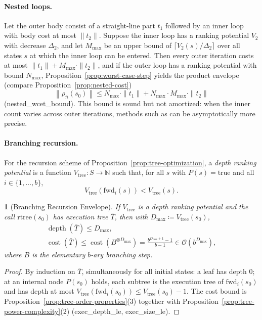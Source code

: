 \documentclass[oneside,english]{amsart}
\numberwithin{equation}{section}
\numberwithin{figure}{section}
\theoremstyle{plain}
\theoremstyle{definition}
\theoremstyle{plain}
\newtheorem{prop}[thm]{\protect\propositionname}
\theoremstyle{remark}
\theoremstyle{plain}
\theoremstyle{definition}
\theoremstyle{plain}
\theoremstyle{remark}
\DeclareMathOperator{\cost}{cost}
\DeclareMathOperator{\depth}{depth}
\newcommand{\lean}[1]{{\ttfamily\small #1}}
\providecommand{\propositionname}{Proposition}
\begin{document}
\paragraph{Nested loops.}
Let the outer body consist of a straight-line part $t_1$ followed by an inner loop with body cost at most $\|t_2\|$. Suppose the inner loop has a ranking potential $V_2$ with decrease $\Delta_2$, and let $M_{\max}$ be an upper bound of $\lceil V_2(s)/\Delta_2 \rceil$ over all states $s$ at which the inner loop can be entered. Then every outer iteration costs at most $\|t_1\| + M_{\max} \cdot \|t_2\|$, and if the outer loop has a ranking potential with bound $N_{\max}$, Proposition~\ref{prop:worst-case-step} yields the product envelope (compare Proposition~\ref{prop:nested-cost})
\[
\left\|\rho_{\bar{n}}(s_0)\right\| \le N_{\max} \cdot \|t_1\| + N_{\max} \cdot M_{\max} \cdot \|t_2\|
\]
(\lean{nested\_\allowbreak wcet\_\allowbreak bound}). This bound is sound but not amortized: when the inner count varies across outer iterations, methods such as \cite{sinn2014complexity,hoffmann2012multivariate} can be asymptotically more precise.

\paragraph{Branching recursion.}
For the recursion scheme of Proposition~\ref{prop:tree-optimization}, a \textit{depth ranking potential} is a function $V_{\text{tree}} : S \to \mathbb{N}$ such that, for all $s$ with $P(s) = \text{true}$ and all $i \in \{1, \dots, b\}$,
\[
V_{\text{tree}}\left(\text{fwd}_i(s)\right) < V_{\text{tree}}(s).
\]

\begin{prop}[Branching Recursion Envelope]\label{prop:tree-envelope}
If $V_{\text{tree}}$ is a depth ranking potential and the call $\text{rtree}(s_0)$ has execution tree $\bar{T}$, then with $D_{\max} \coloneqq V_{\text{tree}}(s_0)$,
\begin{gather*}
\depth(\bar{T}) \le D_{\max}, \\
\cost(\bar{T}) \le \cost\left(B^{\otimes D_{\max}}\right) = \frac{b^{D_{\max} + 1} - 1}{b - 1} \in \mathcal{O}(b^{D_{\max}}),
\end{gather*}
where $B$ is the elementary $b$-ary branching step.
\end{prop}

\begin{proof}
By induction on $\bar{T}$, simultaneously for all initial states: a leaf has depth $0$; at an internal node $P(s_0)$ holds, each subtree is the execution tree of $\text{fwd}_i(s_0)$ and has depth at most $V_{\text{tree}}(\text{fwd}_i(s_0)) \le V_{\text{tree}}(s_0) - 1$. The cost bound is Proposition~\ref{prop:tree-order-properties}(3) together with Proposition~\ref{prop:tree-power-complexity}(2) (\lean{exec\_\allowbreak depth\_\allowbreak le}, \lean{exec\_\allowbreak size\_\allowbreak le}).
\end{proof}
\end{document}
